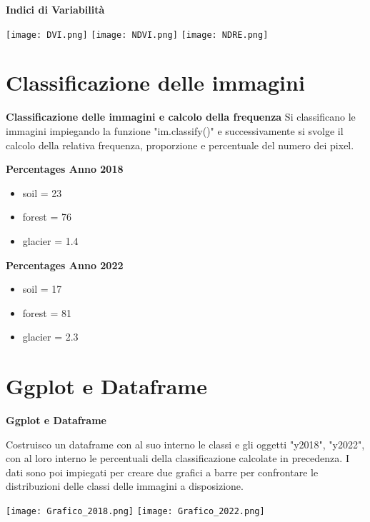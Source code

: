 \documentclass{beamer}
\begin{document}
\begin{frame} 
{\Large\textbf{Indici di Variabilità}}
\parbox{\linewidth}{
    \texttt{[image: DVI.png]}
    \label{Fig: DVI_2018-2022}
    \texttt{[image: NDVI.png]}
    \label{Fig: NDVI_2018-2022}
    \texttt{[image: NDRE.png]}
    \label{Fig: NDRE_2018-2022}
}
\end{frame}

\section{Classificazione delle immagini}

\begin{frame}
{\Large\textbf{Classificazione delle immagini e calcolo della frequenza}}
\vspace{-1cm}
Si classificano le immagini impiegando la funzione "im.classify()" e successivamente si svolge il calcolo della relativa frequenza, proporzione e percentuale del numero dei pixel.


\textbf{Percentages Anno 2018}
  \begin{itemize} 
  \item soil = 23
  \item forest = 76
  \item glacier = 1.4
  \end{itemize} 
\textbf{Percentages Anno 2022}
 \begin{itemize} 
  \item soil = 17
  \item forest = 81
  \item glacier = 2.3
  \end{itemize} 
\end{frame}

\section{Ggplot e Dataframe}

\begin{frame}
{\Large\textbf{Ggplot e Dataframe}}

Costruisco un dataframe con al suo interno le classi e gli oggetti "y2018", "y2022", con al loro interno le percentuali della classificazione calcolate in precedenza.
I dati sono poi impiegati per creare due grafici a barre per confrontare le distribuzioni delle classi delle immagini a disposizione.


    \centering
    \texttt{[image: Grafico\_2018.png]}
    \texttt{[image: Grafico\_2022.png]}
\end{frame}
 
\end{document}
